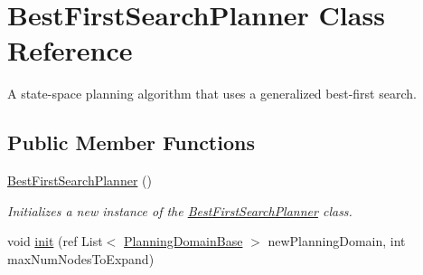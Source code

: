 \hypertarget{class_best_first_search_planner}{\section{Best\-First\-Search\-Planner Class Reference}
\label{class_best_first_search_planner}
}


A state-\/space planning algorithm that uses a generalized best-\/first search.  


\subsection*{Public Member Functions}
\begin{DoxyCompactItemize}
\item 
\hyperlink{class_best_first_search_planner_a66ba1fc8fab38445fe31cfa5297606c4}{Best\-First\-Search\-Planner} ()
\begin{DoxyCompactList}\small\item\em Initializes a new instance of the \hyperlink{class_best_first_search_planner}{Best\-First\-Search\-Planner} class. \end{DoxyCompactList}\item 
\hypertarget{class_best_first_search_planner_a00c06f79faf00907ec4906086c37776f}{void \hyperlink{class_best_first_search_planner_a00c06f79faf00907ec4906086c37776f}{init} (ref List$<$ \hyperlink{class_planning_domain_base}{Planning\-Domain\-Base} $>$ new\-Planning\-Domain, int max\-Num\-Nodes\-To\-Expand)}\label{class_best_first_search_planner_a00c06f79faf00907ec4906086c37776f}


\end{DoxyCompactItemize}
